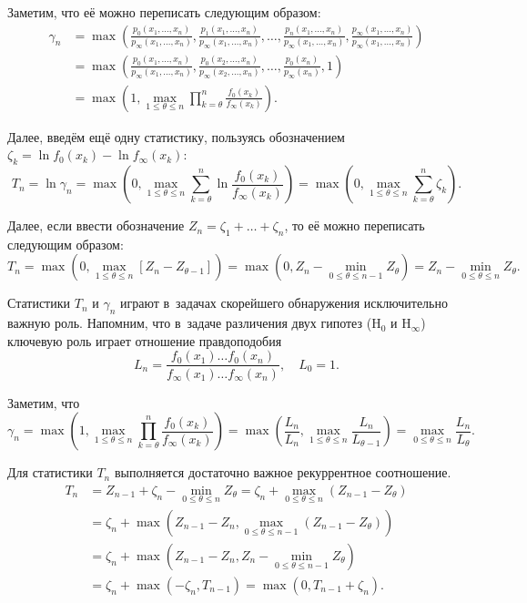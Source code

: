 Заметим, что её можно переписать следующим образом:
\begin{align*}
	\gamma_{n} 
	&= \max\left(
		\frac{p_{0}(x_{1}, \ldots, x_{n})}{p_{\infty}(x_{1}, \ldots, x_{n})},
		\frac{p_{1}(x_{1}, \ldots, x_{n})}{p_{\infty}(x_{1}, \ldots, x_{n})}, 
		\ldots, 
		\frac{p_{n}(x_{1}, \ldots, x_{n})}{p_{\infty}(x_{1}, \ldots, x_{n})},
		\frac{p_{\infty}(x_{1}, \ldots, x_{n})}{p_{\infty}(x_{1}, \ldots, x_{n})}
	\right) \\
	&= \max\left(
		\frac{p_{0}(x_{1}, \ldots, x_{n})}{p_{\infty}(x_{1}, \ldots, x_{n})},
		\frac{p_{0}(x_{2}, \ldots, x_{n})}{p_{\infty}(x_{2}, \ldots, x_{n})}, 
		\ldots, 
		\frac{p_{0}(x_{n})}{p_{\infty}(x_{n})},
		1
	\right) \\
	&= \max\left(
		1, 
		\max_{1 \leq \theta \leq n}
			\prod_{k = \theta}^{n} \frac{f_{0}(x_{k})}{f_{\infty}(x_{k})}
	\right).
\end{align*}

Далее, введём ещё одну статистику, пользуясь обозначением \(\zeta_{k} = \ln f_{0}(x_{k}) - \ln f_{\infty}(x_{k})\):
\[
	T_{n} 
	= \ln \gamma_{n} 
	= \max\left(
		0, 
		\max_{1 \leq \theta \leq n}
			\sum_{k = \theta}^{n} \ln\frac{f_{0}(x_{k})}{f_{\infty}(x_{k})}
	\right)
	= \max\left(
		0, 
		\max_{1 \leq \theta \leq n}
			\sum_{k = \theta}^{n} \zeta_{k}
	\right).
\]

Далее, если ввести обозначение \(Z_{n} = \zeta_{1} + \ldots + \zeta_{n}\), то её можно переписать следующим образом:
\[
	T_{n} 
	= \max\left(
		0, 
		\max_{1 \leq \theta \leq n} [Z_{n} - Z_{\theta - 1}]
	\right)
	= \max\left(
		0, 
		Z_{n} - \min_{0 \leq \theta \leq n - 1} Z_{\theta}
	\right)
	= Z_{n} - \min_{0 \leq \theta \leq n} Z_{\theta}.
\]

Статистики \(T_{n}\) и \(\gamma_{n}\) играют в~задачах скорейшего обнаружения исключительно важную роль. 
Напомним, что в~задаче различения двух гипотез (\(\mathrm{H}_0\) и \(\mathrm{H}_{\infty}\)) ключевую роль играет отношение правдоподобия
\[
	L_{n} 
	= \frac{f_{0}(x_{1}) \ldots f_{0}(x_{n})}{f_{\infty}(x_{1}) \ldots f_{\infty}(x_{n})},
	\quad
	L_{0} 
	= 1.
\]

Заметим, что
\[
	\gamma_{n} 
	= \max\left(
		1, 
		\max_{1 \leq \theta \leq n}
			\prod_{k = \theta}^{n} \frac{f_{0}(x_{k})}{f_{\infty}(x_{k})}
	\right)
	= \max\left(
		\frac{L_{n}}{L_{n}}, 
		\max_{1 \leq \theta \leq n} \frac{L_{n}}{L_{\theta - 1}}
	\right)
	= \max_{0 \leq \theta \leq n} \frac{L_{n}}{L_{\theta}}.
\]

Для статистики \(T_{n}\) выполняется достаточно важное рекуррентное соотношение.
\begin{align*}
	T_{n} 
	&= Z_{n - 1} + \zeta_{n} - \min_{0 \leq \theta \leq n} Z_{\theta}
	= \zeta_{n} + \max_{0 \leq \theta \leq n}(Z_{n - 1} - Z_{\theta}) \\
	&= \zeta_{n} + \max(Z_{n - 1} - Z_{n}, \max_{0 \leq \theta \leq n - 1}(Z_{n - 1} - Z_{\theta})) \\
	&= \zeta_{n} + \max(Z_{n - 1} - Z_{n}, Z_{n} - \min_{0 \leq \theta \leq n - 1} Z_{\theta}) \\
	&= \zeta_{n} + \max(-\zeta_{n}, T_{n - 1}) = \max(0, T_{n - 1} + \zeta_{n}).
\end{align*}

